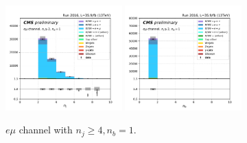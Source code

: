 \begin{figure}[ht]
    \includegraphics[width=0.4\textwidth]{chapters/Analysis/sectionPlots/figures/kinematics_pickles/emu2/1b/emu2_1b_nJets.pdf}
    \includegraphics[width=0.4\textwidth]{chapters/Analysis/sectionPlots/figures/kinematics_pickles/emu2/1b/emu2_1b_nBJets.pdf}
    
    \caption{$e\mu$ channel with $n_j\geq4, n_b=1$.}
\end{figure}

